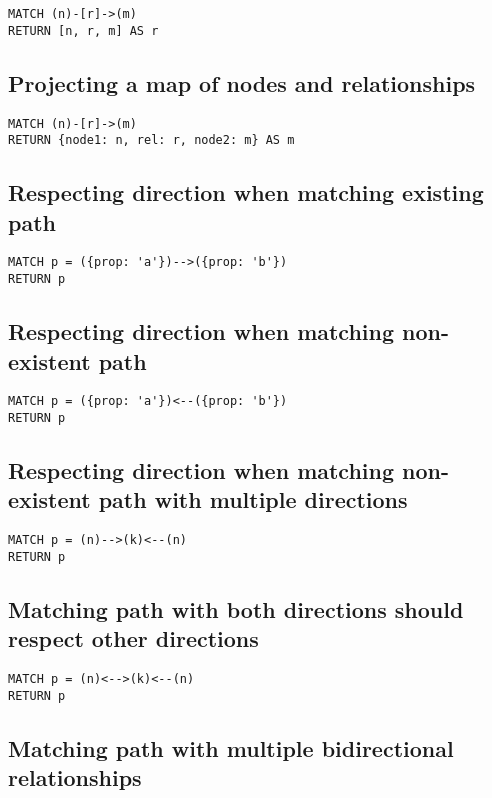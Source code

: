 \begin{lstlisting}
MATCH (n)-[r]->(m)
RETURN [n, r, m] AS r
\end{lstlisting}

\subsection{Projecting a map of nodes and relationships}

\begin{lstlisting}
MATCH (n)-[r]->(m)
RETURN {node1: n, rel: r, node2: m} AS m
\end{lstlisting}

\subsection{Respecting direction when matching existing path}

\begin{lstlisting}
MATCH p = ({prop: 'a'})-->({prop: 'b'})
RETURN p
\end{lstlisting}

\subsection{Respecting direction when matching non-existent path}

\begin{lstlisting}
MATCH p = ({prop: 'a'})<--({prop: 'b'})
RETURN p
\end{lstlisting}

\subsection{Respecting direction when matching non-existent path with multiple directions}

\begin{lstlisting}
MATCH p = (n)-->(k)<--(n)
RETURN p
\end{lstlisting}

\subsection{Matching path with both directions should respect other directions}

\begin{lstlisting}
MATCH p = (n)<-->(k)<--(n)
RETURN p
\end{lstlisting}

\subsection{Matching path with multiple bidirectional relationships}

